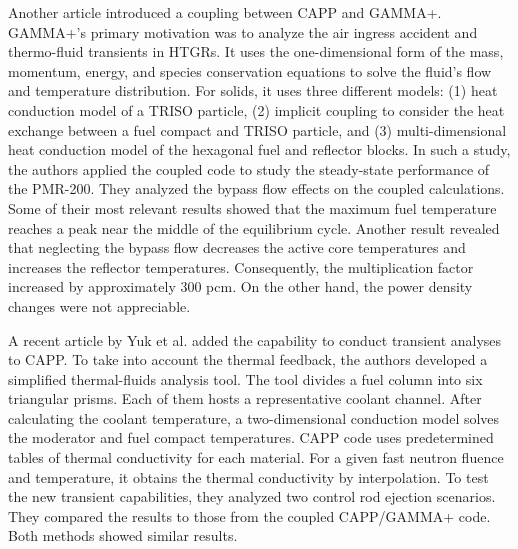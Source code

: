 Another article \cite{tak_cappgamma_2016} introduced a coupling between CAPP and GAMMA+.
GAMMA+'s primary motivation was to analyze the air ingress accident and thermo-fluid transients in \glspl{HTGR}.
It uses the one-dimensional form of the mass, momentum, energy, and species conservation equations to solve the fluid's flow and temperature distribution.
For solids, it uses three different models: (1) heat conduction model of a TRISO particle, (2) implicit coupling to consider the heat exchange between a fuel compact and TRISO particle, and (3) multi-dimensional heat conduction model of the hexagonal fuel and reflector blocks.
In such a study, the authors applied the coupled code to study the steady-state performance of the PMR-200.
They analyzed the bypass flow effects on the coupled calculations.
Some of their most relevant results showed that the maximum fuel temperature reaches a peak near the middle of the equilibrium cycle.
Another result revealed that neglecting the bypass flow decreases the active core temperatures and increases the reflector temperatures.
Consequently, the multiplication factor increased by approximately 300 pcm.
On the other hand, the power density changes were not appreciable.

A recent article by Yuk et al. \cite{yuk_time-dependent_2020} added the capability to conduct transient analyses to CAPP.
To take into account the thermal feedback, the authors developed a simplified thermal-fluids analysis tool.
The tool divides a fuel column into six triangular prisms.
Each of them hosts a representative coolant channel.
After calculating the coolant temperature, a two-dimensional conduction model solves the moderator and fuel compact temperatures.
CAPP code uses predetermined tables of thermal conductivity for each material.
For a given fast neutron fluence and temperature, it obtains the thermal conductivity by interpolation.
To test the new transient capabilities, they analyzed two control rod ejection scenarios.
They compared the results to those from the coupled CAPP/GAMMA+ code.
Both methods showed similar results.

